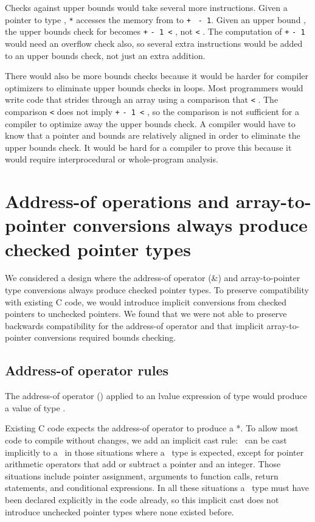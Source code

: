 Checks against upper bounds would  take several more instructions.
Given a pointer  to type , \lstinline|*| accesses the memory from
 to  \lstinline|+|  \lstinline| - 1|. Given an upper bound , the
upper bounds check for  becomes  \lstinline|+|  \lstinline|- 1 <|
, not  \lstinline|<| .  The
computation of  \lstinline|+|  \lstinline|- 1| would need an overflow 
check also,  so several extra instructions would be added to an upper bounds check, 
not just an extra addition.

There would also be more bounds checks because it would be harder for compiler optimizers
to eliminate upper bounds checks in loops.  Most programmers would write code that
strides through an array using a comparison that
 \lstinline|<| . The comparison 
 \lstinline|<|  does not imply
 \lstinline|+|  \lstinline|- 1 <| , so the comparison is
not sufficient for a compiler to optimize away
the upper bounds check. A compiler would have to know that a pointer
and bounds are relatively aligned in order to eliminate the upper bounds
check. It would be hard for a compiler to prove this because it would
require interprocedural or whole-program analysis.

\section{Address-of operations and array-to-pointer conversions always produce checked pointer types}

We considered a design where the address-of operator (\&) and
array-to-pointer type conversions always produce checked pointer types. To
preserve compatibility with existing C code, we would introduce implicit
conversions from checked pointers to unchecked pointers. We found that we were
not able to preserve backwards compatibility for the address-of operator
and that implicit array-to-pointer conversions required bounds checking.

\subsection{Address-of operator rules}

The address-of operator (\code{&}) applied to an lvalue expression of
type  would produce a value of type
\ptrT.

Existing C code expects the address-of operator to produce a  *.
To allow most code to compile without changes, we add an implicit cast
rule: \ptrT\ can be cast
implicitly to a \uncheckedptrT\ in those situations where a \uncheckedptrT\ 
type is expected, except for pointer arithmetic operators
that add or subtract a pointer and an integer. Those situations include
pointer assignment, arguments to function calls, return statements, and
conditional expressions. In all these situations a \uncheckedptrT\
type must have been declared explicitly in the code already, so this
implicit cast does not introduce unchecked pointer types where none existed
before.


